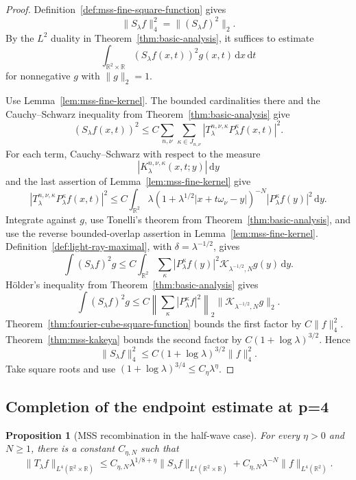 \documentclass[11pt]{article}
\numberwithin{equation}{section}
\newtheorem{proposition}[theorem]{Proposition}
\theoremstyle{definition}
\theoremstyle{remark}
\newcommand{\R}{\mathbb R}
\newcommand{\dd}{\,\mathrm d}
\begin{document}
\begin{proof}
Definition~\ref{def:mss-fine-square-function} gives
\[
\|S_\lambda f\|_4^2=\|(S_\lambda f)^2\|_2.
\]
By the $L^2$ duality in Theorem~\ref{thm:basic-analysis}, it suffices to estimate
\[
\int_{\R^2\times\R}(S_\lambda f(x,t))^2g(x,t)\dd x\dd t
\]
for nonnegative $g$ with $\|g\|_2=1$.

Use Lemma~\ref{lem:mss-fine-kernel}.  The bounded cardinalities there and the Cauchy--Schwarz inequality from Theorem~\ref{thm:basic-analysis} give
\[
(S_\lambda f(x,t))^2
\le C\sum_{n,\nu}\sum_{\kappa\in J_{n,\nu}}
|T_\lambda^{n,\nu,\kappa}P_\lambda^\kappa f(x,t)|^2.
\]
For each term, Cauchy--Schwarz with respect to the measure
\[
|K_\lambda^{n,\nu,\kappa}(x,t;y)|\dd y
\]
and the last assertion of Lemma~\ref{lem:mss-fine-kernel} give
\[
|T_\lambda^{n,\nu,\kappa}P_\lambda^\kappa f(x,t)|^2
\le C\int_{\R^2}
\lambda(1+\lambda^{1/2}|x+t\omega_\nu-y|)^{-N}
|P_\lambda^\kappa f(y)|^2\dd y.
\]
Integrate against $g$, use Tonelli's theorem from Theorem~\ref{thm:basic-analysis}, and use the reverse bounded-overlap assertion in Lemma~\ref{lem:mss-fine-kernel}.  Definition~\ref{def:light-ray-maximal}, with $\delta=\lambda^{-1/2}$, gives
\[
\int (S_\lambda f)^2g
\le C\int_{\R^2}
\sum_\kappa|P_\lambda^\kappa f(y)|^2
\mathcal K_{\lambda^{-1/2},N}g(y)\dd y.
\]
H\"older's inequality from Theorem~\ref{thm:basic-analysis} gives
\[
\int (S_\lambda f)^2g
\le C
\left\|\sum_\kappa|P_\lambda^\kappa f|^2\right\|_2
\|\mathcal K_{\lambda^{-1/2},N}g\|_2.
\]
Theorem~\ref{thm:fourier-cube-square-function} bounds the first factor by $C\|f\|_4^2$.  Theorem~\ref{thm:mss-kakeya} bounds the second factor by $C(1+\log\lambda)^{3/2}$.  Hence
\[
\|S_\lambda f\|_4^2
\le C(1+\log\lambda)^{3/2}\|f\|_4^2.
\]
Take square roots and use $(1+\log\lambda)^{3/4}\le C_\eta\lambda^\eta$.
\end{proof}

\subsection{Completion of the endpoint estimate at p=4}

\begin{proposition}[MSS recombination in the half-wave case]\label{prop:mss-recombination}
For every $\eta>0$ and $N\ge1$, there is a constant $C_{\eta,N}$ such that
\[
\|T_\lambda f\|_{L^4(\R^2\times\R)}
\le C_{\eta,N}\lambda^{1/8+\eta}\|S_\lambda f\|_{L^4(\R^2\times\R)}
+C_{\eta,N}\lambda^{-N}\|f\|_{L^4(\R^2)}.
\]
\end{proposition}
\end{document}
